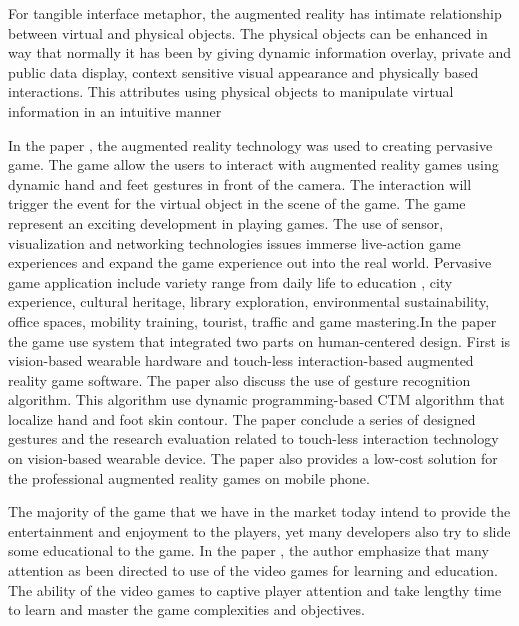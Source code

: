 \documentclass[12pt]{article}
\begin{document}
\par

For tangible interface metaphor, the augmented reality has intimate relationship between virtual and physical objects. The physical objects can be enhanced in way that normally it has been by giving dynamic information overlay, private and public data display, context sensitive visual appearance and physically based interactions. This attributes using physical objects to manipulate virtual information in an intuitive manner

\par In the paper \cite{lv2015touch}, the augmented reality technology was used to creating pervasive game. The game allow the users to interact with augmented reality games using dynamic hand and feet gestures in front of the camera. The interaction will trigger the event for the virtual object in the scene of the game. The game represent an exciting development in playing games. The use of sensor, visualization and networking technologies issues immerse live-action game experiences and expand the game experience out into the real world. Pervasive game application include variety range from daily life to education , city experience, cultural heritage, library exploration, environmental sustainability, office spaces, mobility training, tourist, traffic and game mastering.In the paper the game use system that integrated two parts on human-centered design. First is vision-based wearable hardware and touch-less interaction-based augmented reality game software. The paper also discuss the use of gesture recognition algorithm. This algorithm use dynamic programming-based CTM algorithm that localize hand and foot skin contour.%
The paper conclude a series of designed gestures and the research evaluation related to touch-less interaction technology on vision-based wearable device. The paper also provides a low-cost solution for the professional augmented reality games on mobile phone.
\par The majority of the game that we have in the market today intend to provide the entertainment and enjoyment to the players, yet many developers also try to slide some educational to the game. In the paper \cite{dondlinger2007educational}, the author emphasize that many attention as been directed to use of the video games for learning and education. The ability of the video games to captive player attention and take lengthy time to learn and master the game complexities and objectives.
\end{document}
